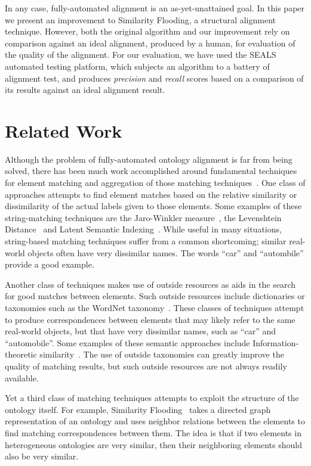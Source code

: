 \documentclass[letterpaper,twocolumn,12pt]{article}
\begin{document}
In any case, fully-automated alignment is an as-yet-unattained goal. 
In this paper we present an improvement to Similarity Flooding, a structural alignment technique. 
However, both the original algorithm and our improvement rely on comparison against an ideal alignment, produced by a human, for evaluation of the quality of the alignment. 
For our evaluation, we have used the SEALS automated testing platform, which subjects an algorithm to a battery of alignment test, and produces \textit{precision} and \textit{recall} scores based on a comparison of its results against an ideal alignment result.

\section{Related Work}

Although the problem of fully-automated ontology alignment is far from being solved, there has been much work accomplished around fundamental techniques for element matching and aggregation of those matching techniques~\cite{euzenat:2007:ontology}.
One class of approaches attempts to find element matches based on the relative similarity or dissimilarity of the actual labels given to those elements. 
Some examples of these string-matching techniques are the Jaro-Winkler measure~\cite{winkler:1999:state}, the Levenshtein Distance~\cite{yujian:2007:levenshtein} and Latent Semantic Indexing~\cite{benzecri:1973:lsi}.
%
While useful in many situations, string-based matching techniques suffer from a common shortcoming; similar real-world objects often have very dissimilar names. 
The words ``car'' and ``autombile'' provide a good example.

Another class of techniques makes use of outside resources as aids in the search for good matches between elements. 
Such outside resources include dictionaries or taxonomies such as the WordNet taxonomy~\cite{miller:1995:wordnet}. 
These classes of techniques attempt to produce correspondences between elements that may likely refer to the same real-world objects, but that have very dissimilar names, such as ``car'' and ``automobile''. 
Some examples of these semantic approaches include Information-theoretic similarity~\cite{lin:1998:information}.
%
The use of outside taxonomies can greatly improve the quality of matching results, but such outside resources are not always readily available.

Yet a third class of matching techniques attempts to exploit the structure of the ontology itself. 
For example, Similarity Flooding~\cite{melnik:2002:similarity} takes a directed graph representation of an ontology and uses neighbor relations between the elements to find matching correspondences between them. 
The idea is that if two elements in heterogeneous ontologies are very similar, then their neighboring elements should also be very similar.
\end{document}
